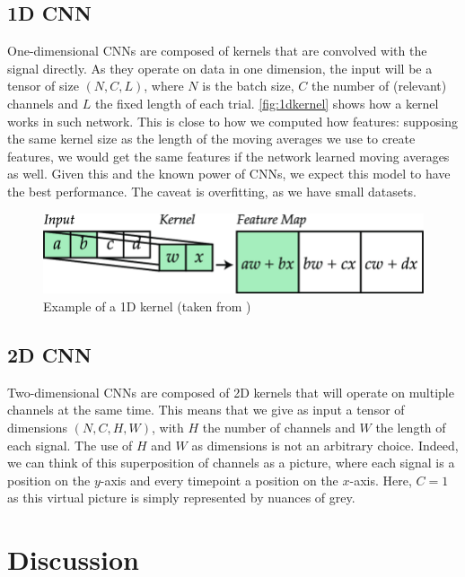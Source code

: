 \documentclass[10pt,conference,compsocconf]{IEEEtran}
\begin{document}
\subsection{1D CNN}
One-dimensional CNNs are composed of kernels that are convolved with the signal directly. As they operate on data in one dimension, the input will be a tensor of size \((N, C, L)\), where \(N\) is the batch size, \(C\) the number of (relevant) channels and \(L\) the fixed length of each trial. \autoref{fig:1dkernel} shows how a kernel works in such network. This is close to how we computed how features: supposing the same kernel size as the length of the moving averages we use to create features, we would get the same features if the network learned moving averages as well. Given this and the known power of CNNs, we expect this model to have the best performance. The caveat is overfitting, as we have small datasets.

\begin{figure}[h!]
  \center
  \includegraphics[width=\linewidth]{images/1d_kernel.png}
  \caption{Example of a 1D kernel (taken from \cite{1dkernel})}
  \label{fig:1dkernel}
\end{figure}
\FloatBarrier

\subsection{2D CNN}
Two-dimensional CNNs are composed of 2D kernels that will operate on multiple channels at the same time. This means that we give as input a tensor of dimensions \((N, C, H, W)\), with \(H\) the number of channels and \(W\) the length of each signal. The use of \(H\) and \(W\) as dimensions is not an arbitrary choice. Indeed, we can think of this superposition of channels as a picture, where each signal is a position on the \(y\)-axis and every timepoint a position on the \(x\)-axis. Here, \(C=1\) as this virtual picture is simply represented by nuances of grey.

\section{Discussion}
\label{sec:discussion}
\end{document}
